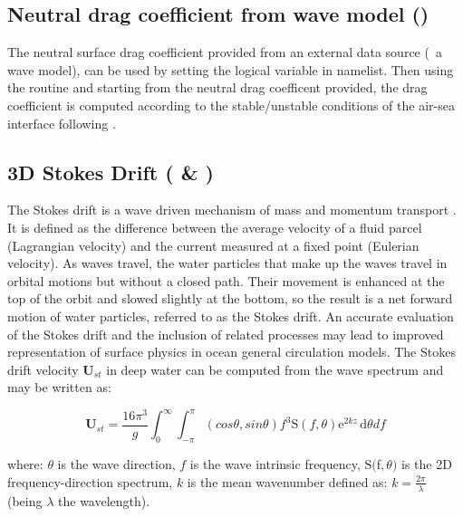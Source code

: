 \documentclass[../main/NEMO_manual]{subfiles}
\begin{document}
\subsection[Neutral drag coefficient from wave model (\forcode{ln_cdgw})]{Neutral drag coefficient from wave model (\protect{})}
\label{subsec:SBC_wave_cdgw}

The neutral surface drag coefficient provided from an external data source (\ie\ a wave model),
can be used by setting the logical variable  in  namelist.
Then using the routine  and starting from the neutral drag coefficent provided,
the drag coefficient is computed according to the stable/unstable conditions of the
air-sea interface following \citet{large.yeager_rpt04}.

\subsection[3D Stokes Drift (\forcode{ln_sdw} \& \forcode{nn_sdrift})]{3D Stokes Drift (\protect{} \& )}
\label{subsec:SBC_wave_sdw}

The Stokes drift is a wave driven mechanism of mass and momentum transport \citep{stokes_ibk09}.
It is defined as the difference between the average velocity of a fluid parcel (Lagrangian velocity)
and the current measured at a fixed point (Eulerian velocity).
As waves travel, the water particles that make up the waves travel in orbital motions but
without a closed path. Their movement is enhanced at the top of the orbit and slowed slightly
at the bottom, so the result is a net forward motion of water particles, referred to as the Stokes drift.
An accurate evaluation of the Stokes drift and the inclusion of related processes may lead to improved
representation of surface physics in ocean general circulation models. %
The Stokes drift velocity $\mathbf{U}_{st}$ in deep water can be computed from the wave spectrum and may be written as:

\[
  \mathbf{U}_{st} = \frac{16{\pi^3}} {g}
  \int_0^\infty \int_{-\pi}^{\pi} (cos{\theta},sin{\theta}) {f^3}
  \mathrm{S}(f,\theta) \mathrm{e}^{2kz}\,\mathrm{d}\theta {d}f
\]

where: ${\theta}$ is the wave direction, $f$ is the wave intrinsic frequency,
$\mathrm{S}($f$,\theta)$ is the 2D frequency-direction spectrum,
$k$ is the mean wavenumber defined as:
$k=\frac{2\pi}{\lambda}$ (being $\lambda$ the wavelength). \\
\end{document}
